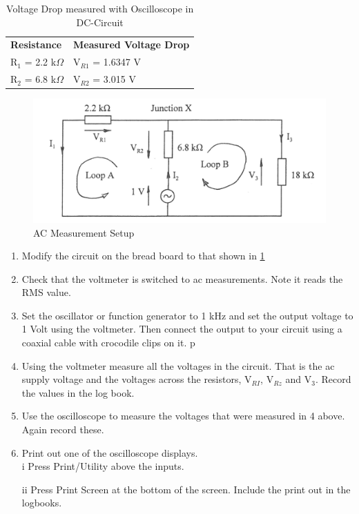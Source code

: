 \begin{table}[h]
\centering
\caption{Voltage Drop measured with Oscilloscope in DC-Circuit}
\label{tab:ResistanceDC2}
\begin{tabular}{ll}
\textbf{Resistance} & \textbf{Measured Voltage Drop} \\
R$_1$ = 2.2 k$\Omega$ &  V$_{R1}$ = 1.6347 V \\
R$_2$ = 6.8 k$\Omega$ &  V$_{R2}$ = 3.015 V            
\end{tabular}
\end{table}













\begin{figure}[H] %
\begin{center}
\includegraphics[width=1\linewidth]{LabOne/Exp2}
\end{center}
\caption{AC Measurement Setup}
\label{fig:AC}
\end{figure}

\begin{enumerate}
  \item Modify the circuit on the bread board to that shown in \ref{fig:AC}
  \item Check that the voltmeter is switched to ac measurements. Note it reads the RMS value.
  \item Set the oscillator or function generator to 1 kHz and set the output voltage to 1 Volt using
the voltmeter. Then connect the output to your circuit using a coaxial cable with crocodile
clips on it. p
  \item Using the voltmeter measure all the voltages in the circuit. That is the ac supply voltage and
the voltages across the resistors, V$_{RI}$, V$_{Rz}$ and V$_{3}$. Record the values in the log book.
  \item Use the oscilloscope to measure the voltages that were measured in 4 above. Again record
these.
  \item  Print out one of the oscilloscope displays. \\
i Press Print/Utility above the inputs.

ii Press Print Screen at the bottom of the screen.
Include the print out in the logbooks.
\end{enumerate}

